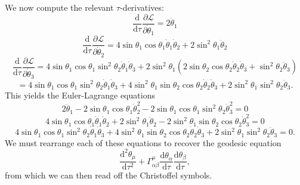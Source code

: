 \documentclass[11pt, letterpaper]{article}
\begin{document}
We now compute the relevant $\tau $-derivatives:
\[
	\frac{\mathrm{d}}{\mathrm{d}\tau } \frac{\partial \mathcal{L} }{\partial \dot{\theta } _1} =2\ddot{\theta }_1
\]
\[
	\frac{\mathrm{d}}{\mathrm{d}\tau } \frac{\partial \mathcal{L} }{\partial \dot{\theta } _2} =4 \sin \theta _1 \cos \theta _1 \dot{\theta } _1 \dot{\theta } _2 + 2 \sin ^2\theta _1 \ddot{\theta }_2
\]
\[
	\frac{\mathrm{d}}{\mathrm{d}\tau } \frac{\partial \mathcal{L} }{\partial \dot{\theta } _3} =4 \sin \theta _1 \cos \theta _1 \sin ^2 \theta _2 \dot{\theta } _1 \dot{\theta } _3 + 2 \sin ^2\theta _1\left(  2\sin \theta _2 \cos \theta _2 \dot{\theta } _2 \dot{\theta } _3 + \sin ^2\theta _2 \ddot{\theta }_3 \right) 
\]
\[
	= 4 \sin \theta _1 \cos \theta _1 \sin ^2\theta _2 \dot{\theta } _1 \dot{\theta } _3 + 4 \sin ^2\theta _1 \sin \theta _2 \cos \theta _2 \dot{\theta } _2 \dot{\theta } _3 + 2 \sin ^2\theta _1 \sin ^2 \theta _2 \ddot{\theta } _3
.\]
This yields the Euler-Lagrange equations
\[
	2 \ddot{\theta } _1 - 2 \sin \theta _1 \cos \theta _1 \dot{\theta } _2^2 - 2 \sin \theta _1 \cos \theta _1 \sin ^2 \theta _2 \dot{\theta } _3^2 = 0
\]
\[
	4 \sin \theta _1 \cos \theta _1 \dot{\theta } _1 \dot{\theta } _2 + 2 \sin ^2\theta _1 \ddot{\theta } _2 - 2 \sin ^ 2\theta _1 \sin \theta _2 \cos \theta _2 \dot{\theta } _3^2 = 0
\]
\[
	4 \sin \theta _1 \cos \theta _1 \sin ^2\theta _2 \dot{\theta } _1 \dot{\theta } _3 + 4 \sin ^2\theta _1 \sin \theta _2 \cos \theta _2 \dot{\theta } _2 \dot{\theta } _3 + 2 \sin ^2\theta _1 \sin ^2 \theta _2 \ddot{\theta } _3 = 0
.\]
We must rearrange each of these equations to recover the geodesic equation
\[
	\frac{\mathrm{d}^2\theta _\mu }{\mathrm{d}\tau ^2} + \Gamma^\mu_{\alpha \beta } \frac{\mathrm{d}\theta _\alpha }{\mathrm{d}\tau } \frac{\mathrm{d}\theta _\beta }{\mathrm{d}\tau } 
,\]
from which we can then read off the Christoffel symbols.
\end{document}
